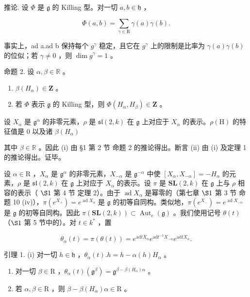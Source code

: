 推论. 设 \(\Phi\) 是 \(\mathfrak{g}\) 的 Killing 型。对一切 \(a, b \in \mathfrak{h}\) ，

\[
\Phi (a, b) = \sum_ {\gamma \in \mathrm{R}} \gamma (a) \gamma (b).
\]

事实上，ad a.ad b 保持每个 \(g^{\gamma}\) 稳定，且它在 \(g^{\gamma}\) 上的限制是比率为 \(\gamma(a)\gamma(b)\) 的位似；若 \(\gamma\neq0\) ，则 \(\dim g^{\gamma}=1\) 。

命题 2. 设 \(\alpha, \beta \in \mathbb{R}\) 。

\begin{enumerate}
\def\labelenumi{(\roman{enumi})}
\item
  \(\beta(H_{\alpha}) \in \mathbf{Z}\) 。
\item
  若 \(\Phi\) 表示 \(\mathfrak{g}\) 的 Killing 型，则 \(\Phi(H_{\alpha}, H_{\beta}) \in \mathbf{Z}\) 。
\end{enumerate}

设 \(X_{\alpha}\) 是 \(\mathfrak{g}^{\alpha}\) 的非零元素，\(\rho\) 是 \(\mathfrak{sl}(2,k)\) 在 \(\mathfrak{g}\) 上对应于 \(X_{\alpha}\) 的表示。\(\rho(\mathrm{H})\) 的特征值是 0 以及诸 \(\beta(H_{\alpha})\)

其中 \(\beta \in \mathbb{R}\) 。因此 (i) 由 §1 第 2 节 命题 2 的推论得出。断言 (ii) 由 (i) 及定理 1 的推论得出。证毕。

设 \(\alpha \in \mathrm{R}\) ，\(X_{\alpha}\) 是 \(\mathfrak{g}^{\alpha}\) 的非零元素，\(X_{-\alpha}\) 是 \(\mathfrak{g}^{-\alpha}\) 中使 \([X_{\alpha}, X_{-\alpha}] = -H_{\alpha}\) 的元素，\(\rho\) 是 \(\mathfrak{sl}(2, k)\) 在 \(\mathfrak{g}\) 上对应于 \(X_{\alpha}\) 的表示。设 \(\pi\) 是 \(\mathbf{SL}(2, k)\) 在 \(\mathfrak{g}\) 上与 \(\rho\) 相容的表示（ \(\S 1\) 第 4 节 定理 2）。由于 \(\operatorname{ad} X_{\alpha}\) 是幂零的（第七章 \(\S 1\) 第 3 节 命题 10 (iv)），\(\pi(e^{X_+}) = e^{\operatorname{ad} X_{\alpha}}\) 是 \(\mathfrak{g}\) 的初等自同构。类似地，\(\pi(e^{X_-}) = e^{\operatorname{ad} X_{-\alpha}}\) 是 \(\mathfrak{g}\) 的初等自同构。因此 \(\pi(\mathbf{SL}(2, k)) \subset \operatorname{Aut}_e(\mathfrak{g})\) 。我们使用记号 \(\theta(t)\) （\(\S 1\) 第 5 节中的）。对 \(t \in k^*\) ，置

\[
\theta_ {\alpha} (t) = \pi (\theta (t)) = e ^ {\mathrm{ad} t X _ {\alpha}} e ^ {\mathrm{ad} t ^ {- 1} X _ {- \alpha}} e ^ {\mathrm{ad} t X _ {\alpha}}.\tag{1}
\]

引理 1. (i) 对一切 \(h \in \mathfrak{h}\) ，\(\theta_{\alpha}(t).h = h - \alpha(h)H_{\alpha}\) 。

\begin{enumerate}
\def\labelenumi{(\roman{enumi})}
\setcounter{enumi}{1}
\item
  对一切 \(\beta \in \mathrm{R}\) ，\(\theta_{\alpha}(t)(\mathfrak{g}^{\beta}) = \mathfrak{g}^{\beta - \beta (H_{\alpha})\alpha}\) 。
\item
  若 \(\alpha, \beta \in \mathrm{R}\) ，则 \(\beta - \beta(H_{\alpha})\alpha \in \mathrm{R}\) 。
\end{enumerate}

